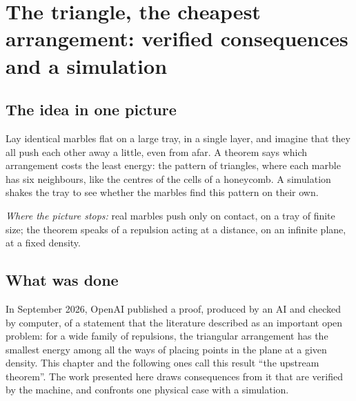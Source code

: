 \chapter[The triangle, the cheapest arrangement]{The triangle, the cheapest arrangement: verified consequences and a simulation}

\section*{The idea in one picture}

\begin{analogie}
Lay identical marbles flat on a large tray, in a single layer, and imagine that they all push each other away a
little, even from afar. A theorem says which arrangement costs the least energy: the pattern of triangles, where each
marble has six neighbours, like the centres of the cells of a honeycomb. A simulation shakes the tray to see whether
the marbles find this pattern on their own.

\emph{Where the picture stops:} real marbles push only on contact, on a tray of finite size; the theorem speaks of a
repulsion acting at a distance, on an infinite plane, at a fixed density.
\end{analogie}

\section*{What was done}

In September 2026, OpenAI published a proof, produced by an AI and checked by computer, of a statement that the
literature described as an important open problem: for a wide family of repulsions, the triangular arrangement has the
smallest energy among all the ways of placing points in the plane at a given density. This chapter and the following
ones call this result ``the upstream theorem''. The work presented here draws consequences from it that are verified
by the machine, and confronts one physical case with a simulation.

